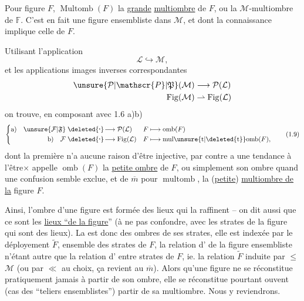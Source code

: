 

Pour  figure $F$, $\operatorname{Multomb}(F)$   la \uline{grande} \uline{multiombre} de $F$, ou la $\mathcal{M}$-multiombre de $\mathbb{F}$.  C'est en fait une figure ensembliste dans $\mathcal{M}$, et dont la connaissance implique celle de $F$.

 Utilisant   l'application
\[
\mathcal{L}\hookrightarrow\mathcal{M},
\]
et les applications images inverses correspondantes
\[
\begin{aligned}
\unsure{\mathcal{P}|\mathscr{P}|\mathfrak{P}}(\mathcal{M})&\longrightarrow\mathcal{P}(\mathcal{L})\\
\operatorname{Fig}(\mathcal{M})&\rightharpoonup\operatorname{Fig}(\mathcal{L})
\end{aligned}
\]
on trouve, en composant avec 1.6 a)b)
\[
\left\{\begin{aligned}
\text{a)}\quad \unsure{\mathcal{F}|\mathfrak{F}}&\mathrel{\deleted{\lhook}\!\longrightarrow}\mathcal{P}(\mathcal{L})&
 F&\longmapsto\operatorname{omb}(F)\\
\text{b)}\quad \mathcal{F}&\mathrel{\deleted{\lhook}\!\longrightarrow}\operatorname{Fig}(\mathcal{L})&
 F&\longmapsto\operatorname{mul\unsure{t|\deleted{t}}omb}(F),
\end{aligned}\right.\tag*{(1.9)}
\]
dont la première n'a aucune raison d'être injective,  par contre a une tendance à l'être$\times$   appelle $\operatorname{omb}(F)$ la \uline{petite ombre} de $F$, ou simplement son ombre quand une confusion semble exclue, et de $\overline m$ pour $\operatorname{multomb}$, la (\uline{petite}) \uline{multiombre de la} figure $F$.

Ainsi, l'ombre d'une figure est formée des lieux qui la raffinent -- on dit aussi que ce sont les \uline{lieux ``de la figure}'' (à ne pas confondre, avec les strates de la figure qui sont des lieux). La  est donc  des ombres de ses strates, elle est indexée par le déployement $\widetilde F$, ensemble des strates de $F$, la relation d' de la figure ensembliste n'étant autre que la relation d' entre strates de $F$, ie. la relation  $\widetilde F$ induite par $\leq$  $\mathcal M$ (ou par $\ll$ au choix, ça revient au $\overline m$). Alors qu'une figure ne se réconstitue pratiquement jamais à partir de son ombre, elle se réconstitue pourtant ouvent (cas des ``teliers ensemblistes'')  partir de sa multiombre. Nous y reviendrons.

